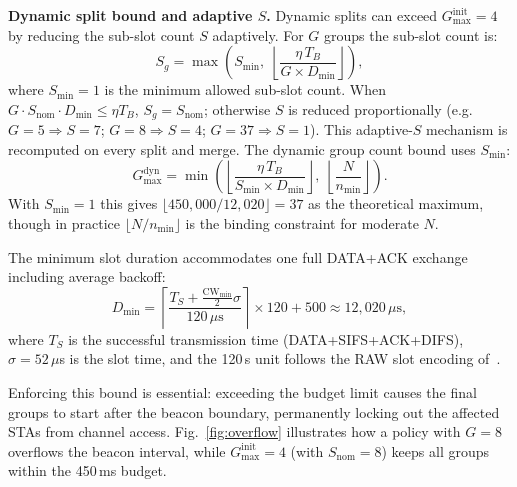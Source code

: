 \documentclass[conference]{IEEEtran}
\begin{document}
\textbf{Dynamic split bound and adaptive $S$.}
Dynamic splits can exceed $G_\mathrm{max}^\mathrm{init}\!=\!4$ by
reducing the sub-slot count $S$ adaptively.
For $G$ groups the sub-slot count is:
\begin{equation}
  S_g = \max\!\left(S_\mathrm{min},\;
    \left\lfloor\frac{\eta\,T_B}{G \times D_\mathrm{min}}\right\rfloor\right),
  \label{eq:sg}
\end{equation}
where $S_\mathrm{min}\!=\!1$ is the minimum allowed sub-slot count.
When $G\!\cdot\!S_\mathrm{nom}\!\cdot\!D_\mathrm{min} \leq \eta T_B$,
$S_g\!=\!S_\mathrm{nom}$; otherwise $S$ is reduced proportionally
(e.g.\ $G\!=\!5\!\Rightarrow\!S\!=\!7$; $G\!=\!8\!\Rightarrow\!S\!=\!4$;
$G\!=\!37\!\Rightarrow\!S\!=\!1$).
This adaptive-$S$ mechanism is recomputed on every split and merge.
The dynamic group count bound uses $S_\mathrm{min}$:
\begin{equation}
  G_\mathrm{max}^\mathrm{dyn} = \min\!\left(
    \left\lfloor\frac{\eta\,T_B}{S_\mathrm{min} \times D_\mathrm{min}}\right\rfloor,\;
    \left\lfloor\frac{N}{n_\mathrm{min}}\right\rfloor
  \right).
  \label{eq:gmax_dyn}
\end{equation}
With $S_\mathrm{min}\!=\!1$ this gives
$\lfloor 450{,}000 / 12{,}020 \rfloor\!=\!37$ as the theoretical
maximum, though in practice $\lfloor N/n_\mathrm{min}\rfloor$ is the
binding constraint for moderate $N$.

The minimum slot duration accommodates one full DATA+ACK exchange
including average backoff:
\begin{equation}
  D_\mathrm{min} = \left\lceil\frac{T_S + \frac{\mathrm{CW}_\mathrm{min}}{2}\sigma}
    {120\,\mu\text{s}}\right\rceil \times 120 + 500 \approx 12{,}020\,\mu\text{s},
  \label{eq:dmin}
\end{equation}
where $T_S$ is the successful transmission time (DATA+SIFS+ACK+DIFS),
$\sigma\!=\!52\,\mu$s is the slot time, and the 120\,\textmu{}s unit
follows the RAW slot encoding of~\cite{std80211ah}.

Enforcing this bound is essential: exceeding the budget limit causes the
final groups to start after the beacon boundary, permanently locking out
the affected STAs from channel access.
Fig.~\ref{fig:overflow} illustrates how a policy with $G\!=\!8$ overflows
the beacon interval, while $G_\mathrm{max}^\mathrm{init}\!=\!4$ (with
$S_\mathrm{nom}\!=\!8$) keeps all groups within the 450\,ms budget.
\end{document}
